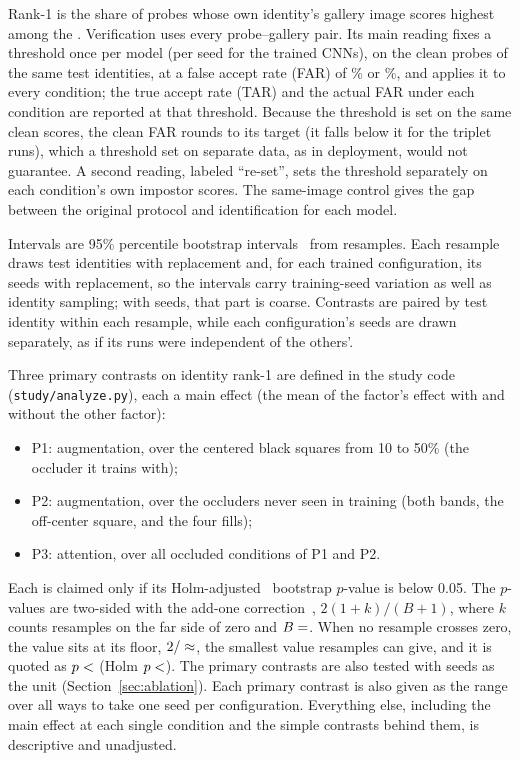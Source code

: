 Rank-1 is the share of probes whose own identity's gallery image scores highest among the . Verification uses every probe--gallery pair. Its main reading fixes a threshold once per model (per seed for the trained CNNs), on the clean probes of the same test identities, at a false accept rate (FAR) of \% or \%, and applies it to every condition; the true accept rate (TAR) and the actual FAR under each condition are reported at that threshold. Because the threshold is set on the same clean scores, the clean FAR rounds to its target (it falls below it for the triplet runs), which a threshold set on separate data, as in deployment, would not guarantee. A second reading, labeled ``re-set'', sets the threshold separately on each condition's own impostor scores. The same-image control gives the gap between the original protocol and identification for each model.

Intervals are 95\% percentile bootstrap intervals~\cite{efron1993bootstrap} from  resamples. Each resample draws test identities with replacement and, for each trained configuration, its  seeds with replacement, so the intervals carry training-seed variation as well as identity sampling; with  seeds, that part is coarse. Contrasts are paired by test identity within each resample, while each configuration's seeds are drawn separately, as if its runs were independent of the others'.

Three primary contrasts on identity rank-1 are defined in the study code (\texttt{study/analyze.py}), each a main effect (the mean of the factor's effect with and without the other factor):
\begin{itemize}
\item P1: augmentation, over the  centered black squares from 10 to 50\% (the occluder it trains with);
\item P2: augmentation, over the  occluders never seen in training (both bands, the off-center square, and the four fills);
\item P3: attention, over all  occluded conditions of P1 and P2.
\end{itemize}
Each is claimed only if its Holm-adjusted~\cite{holm1979simple} bootstrap $p$-value is below 0.05. The $p$-values are two-sided with the add-one correction~\cite{davison1997bootstrap}, $2(1+k)/(B+1)$, where $k$ counts resamples on the far side of zero and $B=\N{resamples}$. When no resample crosses zero, the value sits at its floor, $2/\N{resamples1}\approx\N{p_floor}$, the smallest value  resamples can give, and it is quoted as $p<\N{P1_p}$ (Holm $p<\N{P1_holm}$). The primary contrasts are also tested with seeds as the unit (Section~\ref{sec:ablation}). Each primary contrast is also given as the range over all  ways to take one seed per configuration. Everything else, including the main effect at each single condition and the simple contrasts behind them, is descriptive and unadjusted.
